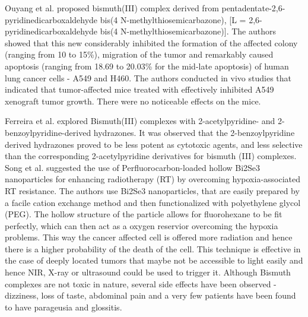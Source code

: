 Ouyang et al. \cite{ouyang2017potent} proposed  bismuth(III) complex derived from pentadentate-2,6-pyridinedicarboxaldehyde bis(4 N-methylthiosemicarbazone),  [L = 2,6-pyridinedicarboxaldehyde bis(4 N-methylthiosemicarbazone)]. The authors showed that this new  considerably inhibited the formation of the affected colony (ranging from 10 to 15\%), migration of the tumor and remarkably caused apoptosis (ranging from 18.69 to 20.03\% for the mid-late apoptosis) of human lung cancer cells -  A549 and H460. The authors conducted in vivo studies that indicated that tumor-affected mice treated with  effectively inhibited A549 xenograft tumor growth. There were no noticeable effects on the mice. 

\hspace{0.1cm}Ferreira et al. \cite{ferreira2016bismuth} explored Bismuth(III) complexes with 2-acetylpyridine- and
2-benzoylpyridine-derived hydrazones. It was observed that  the 2-benzoylpyridine derived hydrazones proved to be less potent as cytotoxic agents, and less selective than the corresponding 2-acetylpyridine derivatives for bismuth (III) complexes. Song et al. \cite{song2016perfluorocarbon} suggested the use of Perfluorocarbon-loaded hollow Bi2Se3 nanoparticles for enhancing radiotherapy (RT) by overcoming hypoxia-associated RT resistance. The authors use Bi2Se3 nanoparticles, that are easily prepared
by a facile cation exchange method and then functionalized with
polyethylene glycol (PEG). The hollow structure of the particle allows for fluorohexane to be fit perfectly, which can then act as a oxygen reservior overcoming the hypoxia problems. This way the cancer affected cell is offered more radiation and hence there is a higher probability of the death of the cell. This technique is effective in the case of deeply located tumors that maybe not be accessible to light easily and hence NIR, X-ray or ultrasound could be used to trigger it. Although Bismuth complexes are not toxic in nature, several side effects have been observed - dizziness, loss of taste, abdominal pain and a very few patients have been found to have parageusia and glossitis\cite{yang2015bismuth}.


